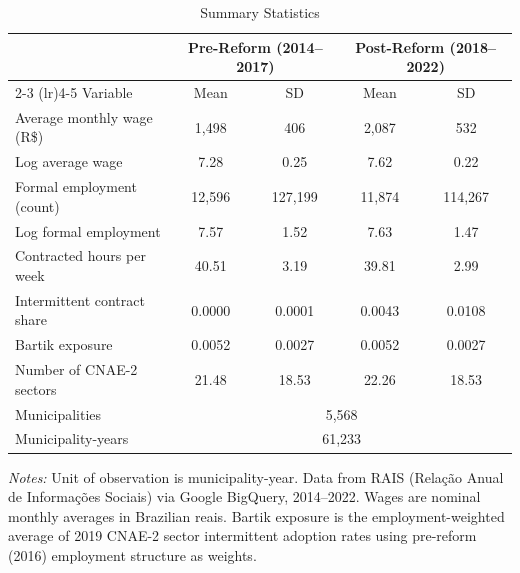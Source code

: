 \begin{table}[htbp]
\centering
\caption{Summary Statistics}
\label{tab:summary}
\begin{tabular}{lcccc}
\hline\hline
 & \multicolumn{2}{c}{Pre-Reform (2014--2017)} & \multicolumn{2}{c}{Post-Reform (2018--2022)} \\
\cmidrule(lr){2-3} \cmidrule(lr){4-5}
Variable & Mean & SD & Mean & SD \\
\hline
Average monthly wage (R\$) & 1,498 & 406 & 2,087 & 532 \\
Log average wage & 7.28 & 0.25 & 7.62 & 0.22 \\
Formal employment (count) & 12,596 & 127,199 & 11,874 & 114,267 \\
Log formal employment & 7.57 & 1.52 & 7.63 & 1.47 \\
Contracted hours per week & 40.51 & 3.19 & 39.81 & 2.99 \\
Intermittent contract share & 0.0000 & 0.0001 & 0.0043 & 0.0108 \\
Bartik exposure & 0.0052 & 0.0027 & 0.0052 & 0.0027 \\
Number of CNAE-2 sectors & 21.48 & 18.53 & 22.26 & 18.53 \\
\hline
Municipalities & \multicolumn{4}{c}{5,568} \\
Municipality-years & \multicolumn{4}{c}{61,233} \\
\hline\hline
\end{tabular}
\begin{tablenotes}
\item \textit{Notes:} Unit of observation is municipality-year. Data from RAIS (Rela\c{c}\~{a}o Anual de Informa\c{c}\~{o}es Sociais) via Google BigQuery, 2014--2022. Wages are nominal monthly averages in Brazilian reais. Bartik exposure is the employment-weighted average of 2019 CNAE-2 sector intermittent adoption rates using pre-reform (2016) employment structure as weights.
\end{tablenotes}
\end{table}
